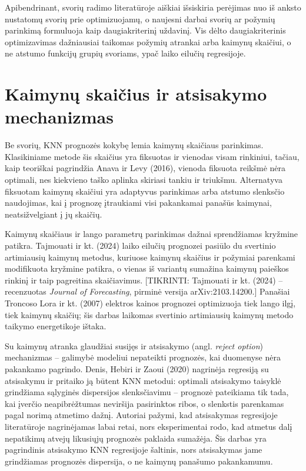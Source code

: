 \documentclass[]{VUMIFTemplateClass}
\begin{document}
    Apibendrinant, svorių radimo literatūroje aiškiai išsiskiria perėjimas nuo iš anksto nustatomų svorių prie optimizuojamų, o naujesni darbai svorių ar požymių parinkimą formuluoja kaip daugiakriterinį uždavinį. Vis dėlto daugiakriterinis optimizavimas dažniausiai taikomas požymių atrankai arba kaimynų skaičiui, o ne atstumo funkcijų grupių svoriams, ypač laiko eilučių regresijoje. %


    \section{Kaimynų skaičius ir atsisakymo mechanizmas}

    Be svorių, KNN prognozės kokybę lemia kaimynų skaičiaus parinkimas. Klasikiniame metode šis skaičius yra fiksuotas ir vienodas visam rinkiniui, tačiau, kaip teoriškai pagrindžia Anava ir Levy (2016), vienoda fiksuota reikšmė nėra optimali, nes kiekvieno taško aplinka skiriasi tankiu ir triukšmu. Alternatyva fiksuotam kaimynų skaičiui yra adaptyvus parinkimas arba atstumo slenksčio naudojimas, kai į prognozę įtraukiami visi pakankamai panašūs kaimynai, neatsižvelgiant į jų skaičių.

    Kaimynų skaičiaus ir lango parametrų parinkimas dažnai sprendžiamas kryžmine patikra. Tajmouati ir kt. (2024) laiko eilučių prognozei pasiūlo du svertinio artimiausių kaimynų metodus, kuriuose kaimynų skaičius ir požymiai parenkami modifikuota kryžmine patikra, o vienas iš variantų sumažina kaimynų paieškos rinkinį ir taip pagreitina skaičiavimus. [TIKRINTI: Tajmouati ir kt. (2024) -- recenzuotas \textit{Journal of Forecasting}, pirminė versija arXiv:2103.14200.] Panašiai Troncoso Lora ir kt. (2007) elektros kainos prognozei optimizuoja tiek lango ilgį, tiek kaimynų skaičių; šis darbas laikomas svertinio artimiausių kaimynų metodo taikymo energetikoje ištaka.

    Su kaimynų atranka glaudžiai susijęs ir atsisakymo (angl. \textit{reject option}) mechanizmas -- galimybė modeliui nepateikti prognozės, kai duomenyse nėra pakankamo pagrindo. Denis, Hebiri ir Zaoui (2020) nagrinėja regresiją su atsisakymu ir pritaiko ją būtent KNN metodui: optimali atsisakymo taisyklė grindžiama sąlyginės dispersijos slenksčiavimu -- prognozė pateikiama tik tada, kai įverčio neapibrėžtumas neviršija pasirinktos ribos, o slenkstis parenkamas pagal norimą atmetimo dažnį. Autoriai pažymi, kad atsisakymas regresijoje literatūroje nagrinėjamas labai retai, nors eksperimentai rodo, kad atmetus dalį nepatikimų atvejų likusiųjų prognozės paklaida sumažėja. Šis darbas yra pagrindinis atsisakymo KNN regresijoje šaltinis, nors atsisakymas jame grindžiamas prognozės dispersija, o ne kaimynų panašumo pakankamumu. %
\end{document}
